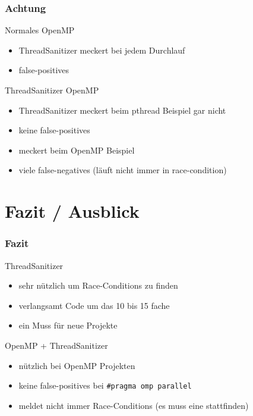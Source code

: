 \documentclass[xcolor=dvipsnames,hyperref={pdfpagelabels=false}]{beamer}
\begin{document}
\begin{frame}
\frametitle{Achtung}
	\begin{block}{Normales OpenMP}
		\begin{itemize}
			\item ThreadSanitizer meckert bei jedem Durchlauf
			\item false-positives
		\end{itemize}
	\end{block}

	\begin{block}{ThreadSanitizer OpenMP}
		\begin{itemize}
			\item ThreadSanitizer meckert beim pthread Beispiel gar nicht
			\item keine false-positives
			\item meckert beim OpenMP Beispiel
			\item viele false-negatives (läuft nicht immer in race-condition)
		\end{itemize}
	\end{block}
\end{frame}


\section{Fazit / Ausblick}
\begin{frame}
	\frametitle{Fazit}
	\begin{block}{ThreadSanitizer}
		\begin{itemize}
			\item sehr nützlich um Race-Conditions zu finden
			\item verlangsamt Code um das 10 bis 15 fache
			\item ein Muss für neue Projekte
		\end{itemize}
	\end{block}

	\begin{block}{OpenMP + ThreadSanitizer}
		\begin{itemize}
			\item nützlich bei OpenMP Projekten
			\item keine false-positives bei \texttt{\#pragma omp parallel}
			\item meldet nicht immer Race-Conditions \newline(es muss eine stattfinden)
		\end{itemize}
	\end{block}



\end{frame}
\end{document}
